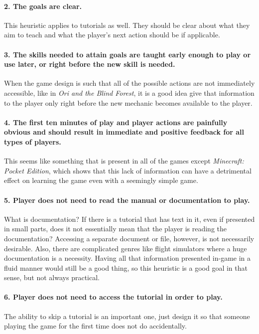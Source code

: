 \paragraph{2. The goals are clear. } This heuristic applies to tutorials as well. They should be clear about what they aim to teach and what the player's next action should be if applicable.

\paragraph{3. The skills needed to attain goals are taught early enough to play or use later, or right before the new skill is needed.} When the game design is such that all of the possible actions are not immediately accessible, like in \textit{Ori and the Blind Forest}, it is a good idea give that information to the player only right before the new mechanic becomes available to the player. 

\paragraph{4. The first ten minutes of play and player actions are painfully obvious and should result in immediate and positive feedback for all types of players. } This seems like something that is present in all of the games except \textit{Minecraft: Pocket Edition}, which shows that this lack of information can have a detrimental effect on learning the game even with a seemingly simple game.

\paragraph{5. Player does not need to read the manual or documentation to play.} What is documentation? If there is a tutorial that has text in it, even if presented in small parts, does it not essentially mean that the player is reading the documentation? Accessing a separate document or file, however, is not necessarily desirable. Also, there are complicated genres like flight simulators where a huge documentation is a necessity. Having all that information presented in-game in a fluid manner would still be a good thing, so this heuristic is a good goal in that sense, but not always practical.

\paragraph{6. Player does not need to access the tutorial in order to play.} The ability to skip a tutorial is an important one, just design it so that someone playing the game for the first time does not do accidentally.

